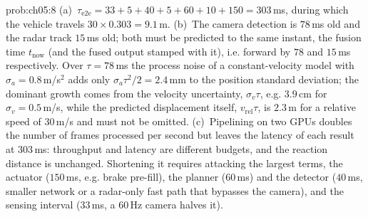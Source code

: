 \begin{sol}{prob:ch05:8}
(a)~$\tau_{\mathrm{e2e}}=33+5+40+5+60+10+150=303$\,ms, during which the vehicle travels $30\times0.303=9.1$\,m. (b)~The camera detection is $78$\,ms old and the radar track $15$\,ms old; both must be predicted to the same instant, the fusion time $t_{\mathrm{now}}$ (and the fused output stamped with it), i.e. forward by $78$ and $15$\,ms respectively. Over $\tau=78$\,ms the process noise of a constant-velocity model with $\sigma_{a}=0.8$\,m/s$^{2}$ adds only $\sigma_{a}\tau^{2}/2=2.4$\,mm to the position standard deviation; the dominant growth comes from the velocity uncertainty, $\sigma_{v}\tau$, e.g. $3.9$\,cm for $\sigma_{v}=0.5$\,m/s, while the predicted displacement itself, $v_{\mathrm{rel}}\tau$, is $2.3$\,m for a relative speed of $30$\,m/s and must not be omitted. (c)~Pipelining on two GPUs doubles the number of frames processed per second but leaves the latency of each result at $303$\,ms: throughput and latency are different budgets, and the reaction distance is unchanged. Shortening it requires attacking the largest terms, the actuator ($150$\,ms, e.g. brake pre-fill), the planner ($60$\,ms) and the detector ($40$\,ms, smaller network or a radar-only fast path that bypasses the camera), and the sensing interval ($33$\,ms, a $60$\,Hz camera halves it).
\end{sol}

